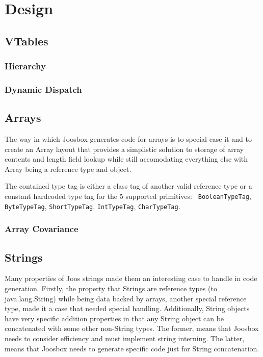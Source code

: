 \documentclass[letterpaper]{article}
\begin{document}
  \section{Design}
  \subsection{VTables}

  \subsubsection{Hierarchy}

  \subsubsection{Dynamic Dispatch}

  \subsection{Arrays}

  The way in which Joosbox generates code for arrays is to special case it and
  to create an Array layout that provides a simplistic solution to storage of
  array contents and length field lookup while still accomodating everything
  else with Array being a reference type and object.


  The contained type tag is either a class tag of another valid reference type
  or a constant hardcoded type tag for the 5 supported primitives: {\tt
  BooleanTypeTag}, {\tt ByteTypeTag}, {\tt ShortTypeTag}. {\tt IntTypeTag},
  {\tt CharTypeTag}.

  \subsubsection{Array Covariance}

  \subsection{Strings}

  Many properties of Joos strings made them an interesting case to handle in
  code generation. Firstly, the property that Strings are reference types (to
  java.lang.String) while being data backed by arrays, another special reference
  type, made it a case that needed special handling. Additionally, String
  objects have very specific addition properties in that any String object can
  be concatenated with some other non-String types. The former, means that
  Joosbox needs to consider efficiency and must implement string interning. The
  latter, means that Joosbox needs to generate specific code just for String
  concatenation.
\end{document}
